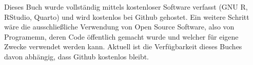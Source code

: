 \documentclass[
  letterpaper,
  DIV=11,
  numbers=noendperiod]{scrreprt}
\begin{document}
\begin{tcolorbox}[enhanced jigsaw, left=2mm, colback=white, colframe=quarto-callout-note-color-frame, opacitybacktitle=0.6, opacityback=0, title=\textcolor{quarto-callout-note-color}{\faInfo}\hspace{0.5em}{Die Kosten eines ``Offenen Buches''}, toptitle=1mm, coltitle=black, colbacktitle=quarto-callout-note-color!10!white, titlerule=0mm, bottomtitle=1mm, leftrule=.75mm, breakable, rightrule=.15mm, bottomrule=.15mm, toprule=.15mm, arc=.35mm]

Dieses Buch wurde vollständig mittels kostenloser Software verfasst (GNU
R, RStudio, Quarto) und wird kostenlos bei Github gehostet. Ein weitere
Schritt wäre die ausschließliche Verwendung von Open Source Software,
also von Programemn, deren Code öffentlich gemacht wurde und welcher für
eigene Zwecke verwendet werden kann. Aktuell ist die Verfügbarkeit
dieses Buches davon abhängig, dass Github kostenlos bleibt.

\end{tcolorbox}
\end{document}
